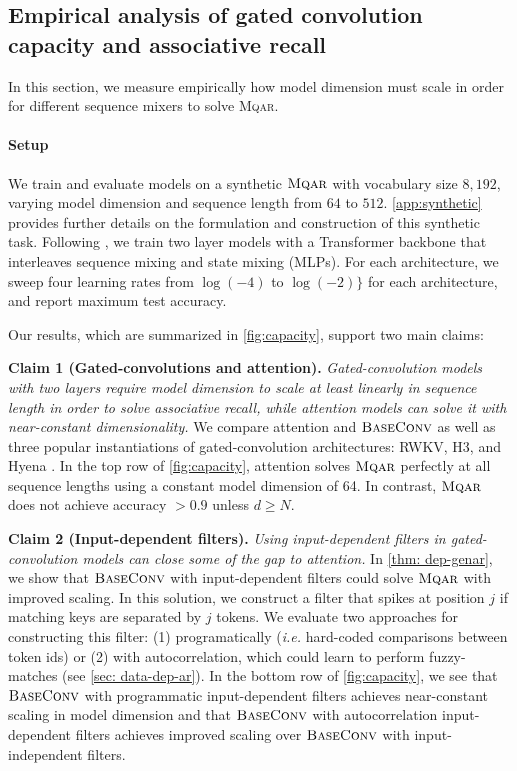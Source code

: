 \subsection{Empirical analysis of gated convolution capacity and associative recall}
\label{sec:empirical-capacity}

In this section, we measure empirically how model dimension must scale in order for different sequence mixers to solve \textsc{Mqar}. 

\paragraph{Setup} We train and evaluate models on a synthetic ${\textsc{Mqar}}$ with vocabulary size $8,192$, varying model dimension and sequence length from $64$ to $512$. \ref{app:synthetic} provides further details on the formulation and construction of this synthetic task. Following \cite{olsson2022context}, we train two layer models with a Transformer backbone that interleaves sequence mixing and state mixing (MLPs). For each architecture, we sweep four learning rates from $\log(-4)$ to $\log(-2)\}$ for each architecture, and report maximum test accuracy. 

Our results, which are summarized in \ref{fig:capacity}, support two main claims:

\textbf{Claim 1 (Gated-convolutions and attention).} \textit{Gated-convolution models with two layers require model dimension to scale at least linearly in sequence length in order to solve associative recall, while attention models can solve it with near-constant dimensionality.} We compare attention and ${\textsc{BaseConv}}$ as well as three popular instantiations of gated-convolution architectures: RWKV, H3, and Hyena \citep{peng2023rwkv, fu2023simple, poli2023hyena}. In the top row of \ref{fig:capacity}, attention solves ${\textsc{Mqar}}$ perfectly at all sequence lengths using a constant model dimension of 64. In contrast, ${\textsc{Mqar}}$ does not achieve accuracy $>0.9$ unless $d \geq N$.

\label{sec:data-dependent-synthetics}

\textbf{Claim 2 (Input-dependent filters).} \textit{Using input-dependent filters in gated-convolution models can close some of the gap to attention.} In \ref{thm: dep-genar}, we show that ${\textsc{BaseConv}}$ with input-dependent filters could solve ${\textsc{Mqar}}$ with improved scaling. In this solution, we construct a filter that spikes at position $j$ if matching keys are separated by $j$ tokens. We evaluate two approaches for constructing this filter: (1) programatically (\textit{i.e.} hard-coded comparisons between token ids) or (2) with autocorrelation, which could learn to perform fuzzy-matches (see \ref{sec: data-dep-ar}). In the bottom row of \ref{fig:capacity}, we see that $\textsc{BaseConv}$ with programmatic input-dependent filters achieves near-constant scaling in model dimension and that $\textsc{BaseConv}$ with autocorrelation input-dependent filters achieves improved scaling over $\textsc{BaseConv}$ with input-independent filters.

